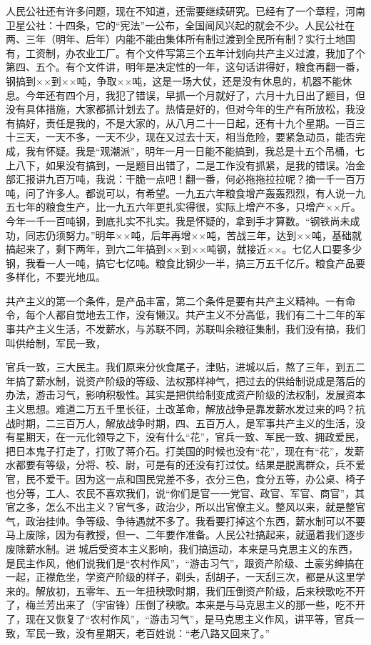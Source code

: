 人民公社还有许多问题，现在不知道，还需要继续研究。已经有了一个章程，河南卫星公社：十四条，它的“宪法”一公布，全国闻风兴起的就会不少。人民公社在两、三年（明年、后年）内能不能由集体所有制过渡到全民所有制？实行土地国有，工资制，办农业工厂。有个文件写第三个五年计划向共产主义过渡，我加了个第四、五个。有个文件讲，明年是决定性的一年，这句话讲得好，粮食再翻一番，钢搞到××到××吨，争取××吨，这是一场大仗，还是没有休息的，机器不能休息。今年还有四个月，我犯了错误，早抓一个月就好了，六月十九日出了题目，但没有具体措施，大家都抓计划去了。热情是好的，但对今年的生产有所放松，我没有搞好，责任是我的，不是大家的，从八月二十一日起，还有十九个星期。一百三十三天，一天不多，一天不少，现在又过去十天，相当危险，要紧急动员，能否完成，我有怀疑。我是“观潮派”，明年一月一日能不能搞到，我总是十五个吊桶，七上八下，如果没有搞到，一是题目出错了，二是工作没有抓紧，是我的错误。冶金部汇报讲九百万吨，我说：干脆一点吧！翻一番，何必拖拖拉拉呢？摘一千一百万吨，问了许多人。都说可以，有希望。一九五六年粮食增产轰轰烈烈，有人说一九五七年的粮食生产，比一九五六年更扎实得很，实际上增产不多，只增产××斤。今年一千一百吨钢，到底扎实不扎实。我是怀疑的，拿到手才算数。“钢铁尚未成功，同志仍须努力。”明年××吨，后年再增××吨，苦战三年，达到××吨，基础就搞起来了，剩下两年，到六二年搞到××到××吨钢，就接近××。七亿人口要多少钢，我看一人一吨，搞它七亿吨。粮食比钢少一半，搞三万五千亿斤。粮食产品要多样化，不要光地瓜。

共产主义的第一个条件，是产品丰富，第二个条件是要有共产主义精神。一有命令，每个人都自觉地去工作，没有懒汉。共产主义不分高低，我们有二十二年的军事共产主义生活，不发薪水，与苏联不同，苏联叫余粮征集制，我们没有搞，我们叫供给制，军民一致，

官兵一致，三大民主。我们原来分伙食尾子，津贴，进城以后，熬了三年，到五二年搞了薪水制，说资产阶级的等级、法权那样神气，把过去的供给制说成是落后的办法，游击习气，影响积极性。其实是把供给制变成资产阶级的法权制，发展资本主义思想。难道二万五千里长征，土改革命，解放战争是靠发薪水发过来的吗？抗战时期，二三百万人，解放战争时期，四、五百万人，是军事共产主义的生活，没有星期天，在一元化领导之下，没有什么“花”，官兵一致、军民一致、拥政爱民，把日本鬼子打走了，打败了蒋介石。打美国的时候也没有“花”，现在有“花”，发薪水都要有等级，分将、校、尉，可是有的还没有打过仗。结果是脱离群众，兵不爱官，民不爱干。因为这一点和国民党差不多，衣分三色，食分五等，办公桌、椅子也分等，工人、农民不喜欢我们，说“你们是官一一党官、政官、军官、商官”，其官之多，怎么不出主义？官气多，政治少，所以出官僚主义。整风以来，就是整官气，政治挂帅。争等级、争待遇就不多了。我看要打掉这个东西，薪水制可以不要马上废除，因为有教授，但一、二年要作准备。人民公社搞起来，就逼着我们逐步废除薪水制。进城后受资本主义影响，我们搞运动，本来是马克思主义的东西，是民主作风，他们说我们是“农村作风”，“游击习气”，跟资产阶级、土豪劣绅搞在一起，正襟危坐，学资产阶级的样子，剃头，刮胡子，一天刮三次，都是从这里学来的。解放初，五零年、五一年扭秧歌时期，我们压倒资产阶级，后来秧歌吃不开了，梅兰芳出来了（宇宙锋）压倒了秧歌。本来是与马克思主义的那一些，吃不开了，现在又恢复了“农村作风”，“游击习气”，是马克思主义作风，讲平等，官兵一致，军民一致，没有星期天，老百姓说：“老八路又回来了。”

